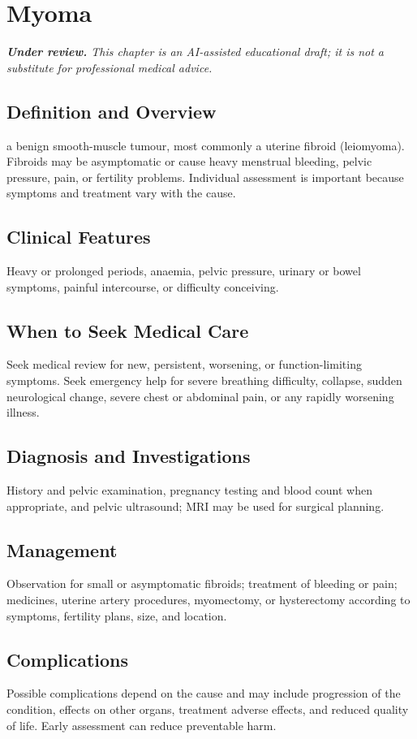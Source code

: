 \chapter{Myoma}

\medskip
\noindent\textit{\textbf{Under review.} This chapter is an AI-assisted educational draft; it is not a substitute for professional medical advice.}

\section*{Definition and Overview}
a benign smooth-muscle tumour, most commonly a uterine fibroid (leiomyoma). Fibroids may be asymptomatic or cause heavy menstrual bleeding, pelvic pressure, pain, or fertility problems. Individual assessment is important because symptoms and treatment vary with the cause.

\section*{Clinical Features}
Heavy or prolonged periods, anaemia, pelvic pressure, urinary or bowel symptoms, painful intercourse, or difficulty conceiving.

\section*{When to Seek Medical Care}
Seek medical review for new, persistent, worsening, or function-limiting symptoms. Seek emergency help for severe breathing difficulty, collapse, sudden neurological change, severe chest or abdominal pain, or any rapidly worsening illness.

\section*{Diagnosis and Investigations}
History and pelvic examination, pregnancy testing and blood count when appropriate, and pelvic ultrasound; MRI may be used for surgical planning.

\section*{Management}
Observation for small or asymptomatic fibroids; treatment of bleeding or pain; medicines, uterine artery procedures, myomectomy, or hysterectomy according to symptoms, fertility plans, size, and location.

\section*{Complications}
Possible complications depend on the cause and may include progression of the condition, effects on other organs, treatment adverse effects, and reduced quality of life. Early assessment can reduce preventable harm.

